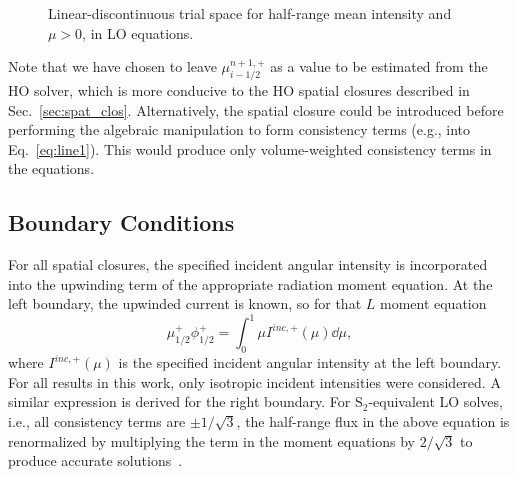 \begin{figure}[H]
    \centering
    {}
    \caption{Linear-discontinuous trial space for half-range mean intensity and ${\mu>0}$,
        in LO equations.\label{fig:ld_il}}
\end{figure}

Note that we have chosen to leave $\mu_{i-1/2}^{n+1,+}$ as a value to be estimated from the HO solver,
which is more conducive to the HO spatial closures described in
Sec.~\ref{sec:spat_clos}.
Alternatively, the spatial closure could be introduced before performing the algebraic
manipulation to form consistency terms (e.g., into Eq.~\eqref{eq:line1}).  This would produce only volume-weighted consistency
terms in the equations.  




\subsection{Boundary Conditions}

For all spatial closures, the specified incident angular intensity is
incorporated into the upwinding term of the appropriate radiation moment equation.   At the left
boundary, the upwinded current is known, so for that $L$ moment equation
\begin{equation}
    \mu_{1/2}^+ \phi_{1/2}^+ = \int_{0}^1 \mu I^{inc,+}(\mu) \dd \mu,
\end{equation}
where $I^{inc,+}(\mu)$ is the specified incident angular intensity at the left boundary.  For all
results in this work, only isotropic incident intensities were considered.
A similar expression is derived for the right boundary.
  For S$_2$-equivalent LO solves, i.e., all consistency
terms are $\pm 1/\sqrt{3}$, the half-range flux in the above equation is renormalized by
multiplying the term in the moment equations by $2/\sqrt{3}$ to produce accurate solutions~\cite{morel_notes}.     


